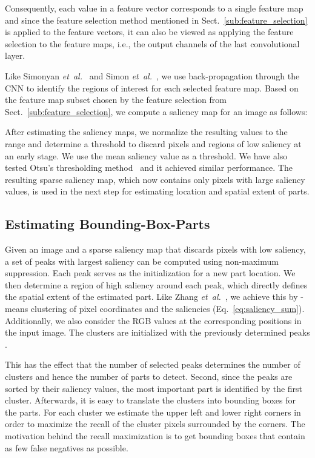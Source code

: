 \documentclass[runningheads]{llncs}
\newcommand{\etal}{\emph{et~al.}}
\begin{document}
Consequently, each value in a feature vector corresponds to a single feature map and since the feature selection method mentioned in Sect.~\ref{sub:feature_selection} is applied to the feature vectors, it can also be viewed as applying the feature selection to the feature maps, i.e., the output channels of the last convolutional layer.

Like Simonyan \etal~\cite{simonyan2013deep} and Simon \etal~\cite{Simon_2015_ICCV}, we use back-propagation through the CNN to identify the regions of interest for each selected feature map.
Based on the feature map subset  chosen by the feature selection from Sect.~\ref{sub:feature_selection}, we compute a saliency map  for an image  as follows:


\vspace{-.2cm}



After estimating the saliency maps, we normalize the resulting values to the range  and determine a threshold to discard pixels and regions of low saliency at an early stage.
We use the mean saliency value as a threshold.
We have also tested Otsu's thresholding method~\cite{otsu1979threshold} and it achieved similar performance.
The resulting sparse saliency map, which now contains only pixels with large saliency values, is used in the next step for estimating location and spatial extent of parts.

\subsection{Estimating Bounding-Box-Parts}
\label{sub:bb_estimation}

Given an image and a sparse saliency map that discards pixels with low saliency, a set of  peaks  with largest saliency can be computed using non-maximum suppression.
Each peak serves as the initialization for a new part location.
We then determine a region of high saliency around each peak, which directly defines the spatial extent of the estimated part.
Like Zhang \etal~\cite{zhang2019unsupervised}, we achieve this by \mbox{-means} clustering of pixel coordinates  and the saliencies  (Eq.~\ref{eq:saliency_sum}).
Additionally, we also consider the RGB values at the corresponding positions in the input image.
The clusters are initialized with the previously determined peaks .

This has the effect that the number of selected peaks determines the number of clusters and hence the number of parts to detect.
Second, since the peaks are sorted by their saliency values, the most important part is identified by the first cluster.
Afterwards, it is easy to translate the clusters into bounding boxes for the parts.
For each cluster we estimate the upper left and lower right corners in order to maximize the recall of the cluster pixels surrounded by the corners.
The motivation behind the recall maximization is to get bounding boxes that contain as few false negatives as possible.
\end{document}
